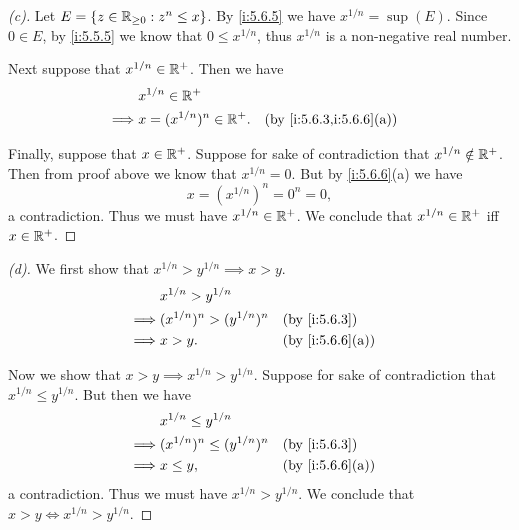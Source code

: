 \begin{proof}[(c)]
  Let \(E = \left\lbrace z \in \mathbb{R}_{\geq 0} : z^n \leq x\right\rbrace\).
  By \cref{i:5.6.5} we have \(x^{1 / n} = \sup(E)\).
  Since \(0 \in E\), by \cref{i:5.5.5} we know that \(0 \leq x^{1 / n}\), thus \(x^{1 / n}\) is a non-negative real number.

  Next suppose that \(x^{1 / n} \in \mathbb{R}^+\).
  Then we have
  \begin{align*}
             & x^{1 / n} \in \R^+                                       \\
    \implies & x = (x^{1 / n})^n \in \R^+. &  & \by{i:5.6.3,i:5.6.6}[a]
  \end{align*}

  Finally, suppose that \(x \in \mathbb{R}^+\).
  Suppose for sake of contradiction that \(x^{1 / n} \notin \mathbb{R}^+\).
  Then from proof above we know that \(x^{1 / n} = 0\).
  But by \cref{i:5.6.6}(a) we have
  \[
    x = (x^{1 / n})^n = 0^n = 0,
  \]
  a contradiction.
  Thus we must have \(x^{1 / n} \in \mathbb{R}^+\).
  We conclude that \(x^{1 / n} \in \mathbb{R}^+\) iff \(x \in \mathbb{R}^+\).
\end{proof}

\begin{proof}[(d)]
  We first show that \(x^{1 / n} > y^{1 / n} \implies x > y\).
  \begin{align*}
             & x^{1 / n} > y^{1 / n}                              \\
    \implies & (x^{1 / n})^n > (y^{1 / n})^n &  & \by{i:5.6.3}    \\
    \implies & x > y.                        &  & \by{i:5.6.6}[a]
  \end{align*}

  Now we show that \(x > y \implies x^{1 / n} > y^{1 / n}\).
  Suppose for sake of contradiction that \(x^{1 / n} \leq y^{1 / n}\).
  But then we have
  \begin{align*}
             & x^{1 / n} \leq y^{1 / n}                              \\
    \implies & (x^{1 / n})^n \leq (y^{1 / n})^n &  & \by{i:5.6.3}    \\
    \implies & x \leq y,                        &  & \by{i:5.6.6}[a]
  \end{align*}
  a contradiction.
  Thus we must have \(x^{1 / n} > y^{1 / n}\).
  We conclude that \(x > y \iff x^{1 / n} > y^{1 / n}\).
\end{proof}

